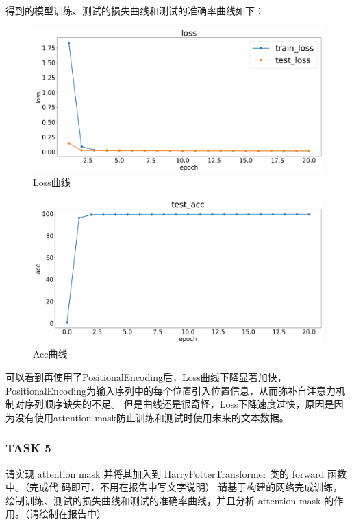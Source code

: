\documentclass{article}%
\begin{document}
得到的模型训练、测试的损失曲线和测试的准确率曲线如下：
\begin{figure}[H]
    \centering
    \includegraphics[width=0.9\linewidth]{../exp_task4/figs/loss.png}
    \caption{Loss曲线}
\end{figure}
\begin{figure}[H]
    \centering
    \includegraphics[width=0.9\linewidth]{../exp_task4/figs/test_acc.png}
    \caption{Acc曲线}
\end{figure}

可以看到再使用了PositionalEncoding后，Loss曲线下降显著加快，
PositionalEncoding为输入序列中的每个位置引入位置信息，从而弥补自注意力机制对序列顺序缺失的不足。
但是曲线还是很奇怪，Loss下降速度过快，原因是因为没有使用attention mask防止训练和测试时使用未来的文本数据。

\subsubsection{TASK 5}
请实现 attention mask 并将其加入到 HarryPotterTransformer 类的 forward 函数中。（完成代
码即可，不用在报告中写文字说明）
请基于构建的网络完成训练，绘制训练、测试的损失曲线和测试的准确率曲线，并且分析 attention
mask 的作用。（请绘制在报告中）
\end{document}
